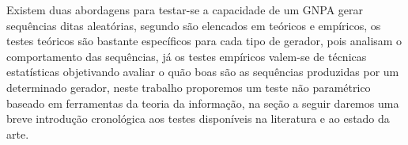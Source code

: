 Existem duas abordagens para testar-se a capacidade de um GNPA gerar sequências ditas aleatórias, segundo \citep{LEcuyer:92} são elencados em teóricos e empíricos, os testes teóricos são bastante específicos para cada tipo de gerador, pois analisam o comportamento das sequências, já os testes empíricos valem-se de técnicas estatísticas objetivando avaliar o quão boas são as sequências produzidas por um determinado gerador, neste trabalho proporemos um teste não paramétrico baseado em ferramentas da teoria da informação, na seção a seguir daremos uma breve introdução cronológica aos testes disponíveis na literatura e ao estado da arte.
  
